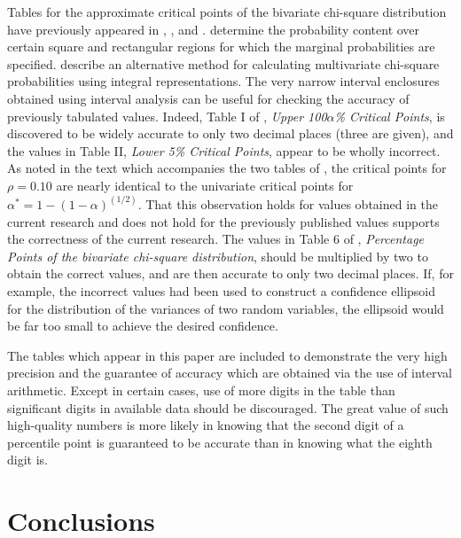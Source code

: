 Tables for the approximate 
critical points of the bivariate chi-square distribution 
have previously appeared in \cite{GunstNote}, \cite{Gunst}, 
and \cite{Krish}.
\cite{Jensen} determine the probability content over certain square and
rectangular regions for which the marginal probabilities are specified.
\cite{Dutt76} describe an alternative method for calculating multivariate
chi-square probabilities using integral representations.
The very narrow interval enclosures obtained using interval analysis
can be useful for checking the accuracy of
previously tabulated values.   Indeed, Table I  of \cite{GunstNote},
{\it Upper 100$\alpha$\%
Critical Points},
is discovered to be widely accurate to only two decimal places (three
are given), and the values in Table II, {\it Lower 5\% Critical Points},
appear to be wholly incorrect.  As 
noted in the text which accompanies the two tables of \cite{GunstNote},
the critical points for $\rho = 0.10$ are
nearly identical to the univariate critical points for 
$\alpha^* = 1 - (1-\alpha)^{(1/2)}$.  That this observation holds for values
obtained in the current research and does not hold for the previously 
published values supports the correctness of the current research.
The values in Table 6 of \cite{Krish}, {\it Percentage
Points of the bivariate chi-square distribution}, should be multiplied by
two to obtain the correct values, and are then accurate to only two decimal
places.  If, for example, the incorrect values had been used to construct a
confidence ellipsoid for the distribution of the variances of two random
variables, the ellipsoid would be far too small to achieve the desired
confidence. 
  
The tables which appear in this paper are included to demonstrate the very
high precision and the guarantee of accuracy which are obtained via the use of
interval arithmetic.  Except in certain cases, use of more digits in the table
than significant digits in available data should be discouraged.  The great
value of such high-quality numbers is more likely in knowing
that the second
digit of a percentile point is guaranteed to be accurate than
in knowing what the eighth digit is.
  



\section{Conclusions}


